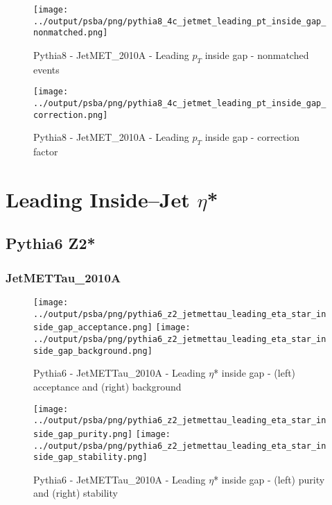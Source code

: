 \documentclass[11pt]{book}
\begin{document}
\begin{figure}[ht]
\centering
\texttt{[image: ../output/psba/png/pythia8\_4c\_jetmet\_leading\_pt\_inside\_gap\_nonmatched.png]}
\caption{Pythia8 - JetMET\_2010A - Leading $p_{T}$ inside gap - nonmatched events}
\label{fig:p8_jetmet_leading_pt_inside_gap_nonmatched}
\end{figure}

\begin{figure}[ht]
\centering
\texttt{[image: ../output/psba/png/pythia8\_4c\_jetmet\_leading\_pt\_inside\_gap\_correction.png]}
\caption{Pythia8 - JetMET\_2010A - Leading $p_{T}$ inside gap - correction factor}
\label{fig:p8_jetmet_leading_pt_inside_gap_correction}
\end{figure}



\clearpage
\chapter{Leading Inside--Jet $\eta$*}
\section{Pythia6 Z2*}
\subsection{JetMETTau\_2010A}

\begin{figure}[ht]
\centering
\texttt{[image: ../output/psba/png/pythia6\_z2\_jetmettau\_leading\_eta\_star\_inside\_gap\_acceptance.png]}
\texttt{[image: ../output/psba/png/pythia6\_z2\_jetmettau\_leading\_eta\_star\_inside\_gap\_background.png]}
\caption{Pythia6 - JetMETTau\_2010A - Leading $\eta$* inside gap - (left) acceptance and (right) background}
\label{fig:p6_jetmettau_leading_eta_star_inside_gap_ab}
\end{figure}

\begin{figure}[ht]
\centering
\texttt{[image: ../output/psba/png/pythia6\_z2\_jetmettau\_leading\_eta\_star\_inside\_gap\_purity.png]}
\texttt{[image: ../output/psba/png/pythia6\_z2\_jetmettau\_leading\_eta\_star\_inside\_gap\_stability.png]}
\caption{Pythia6 - JetMETTau\_2010A - Leading $\eta$* inside gap - (left) purity and (right) stability}
\label{fig:p6_jetmettau_leading_eta_star_inside_gap_ps}
\end{figure}
\end{document}
